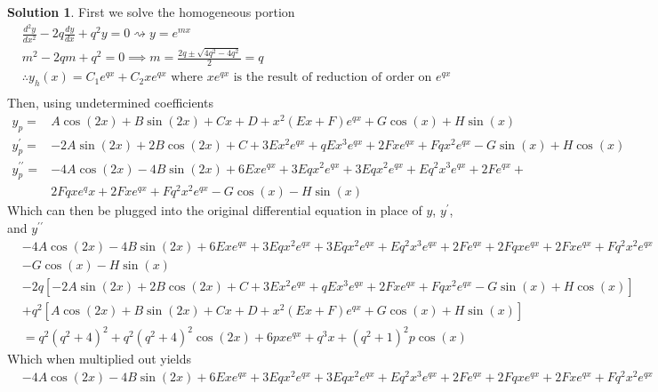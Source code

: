 \documentclass[10pt]{article}
\theoremstyle{definition}
\newtheorem{soln}{Solution}
\begin{document}
\begin{soln} First we solve the homogeneous portion
  \begin{align*}
     & \frac{d^2y}{dx^2}-2q\frac{dy}{dx}+q^2y=0\rightsquigarrow y=e^{mx}                                                    \\
     & m^2-2qm+q^2=0 \implies m = \frac{2q\pm\sqrt{4q^2-4q^2}}{2} = q                                                       \\
     & \therefore y_h(x)=C_1e^{qx}+C_2xe^{qx} \text{ where } xe^{qx} \text{ is the result of reduction of order on } e^{qx} \\
  \end{align*}
  Then, using undetermined coefficients
  \begin{align*}
    y_p=                & A\cos\left(2x\right)+B\sin\left(2x\right)+Cx+D+x^2\left(Ex+F\right)e^{qx}+G\cos(x)+H\sin(x) \\
    y_p^\prime=         & -2A\sin(2x)+2B\cos(2x)+C+3Ex^2e^{qx}+qEx^3e^{qx}+2Fxe^{qx}+Fqx^2e^{qx}-G\sin(x)+H\cos(x)    \\
    y_p^{\prime\prime}= & -4A\cos(2x)-4B\sin(2x)+6Exe^{qx}+3Eqx^2e^{qx}+3Eqx^2e^{qx}+Eq^2x^3e^{qx}+2Fe^{qx}+          \\ 
                        & 2Fqxe^qx+2Fxe^{qx}+Fq^2x^2e^{qx}-G\cos(x)-H\sin(x)
  \end{align*}
  Which can then be plugged into the original differential equation in place of $y$, $y^\prime$, and $y^{\prime\prime}$
  \begin{align*}
     & -4A\cos(2x)-4B\sin(2x)+6Exe^{qx}+3Eqx^2e^{qx}+3Eqx^2e^{qx}+Eq^2x^3e^{qx}+2Fe^{qx}+2Fqxe^{qx}+2Fxe^{qx}+Fq^2x^2e^{qx} \\ &-G\cos(x)-H\sin(x)    \\                                                              
     & -2q\left[-2A\sin(2x)+2B\cos(2x)+C+3Ex^2e^{qx}+qEx^3e^{qx}+2Fxe^{qx}+Fqx^2e^{qx}-G\sin(x)+H\cos(x)\right]             \\
     & +q^2\left[A\cos\left(2x\right)+B\sin\left(2x\right)+Cx+D+x^2\left(Ex+F\right)e^{qx}+G\cos(x)+H\sin(x)\right]         \\ 
     & =q^2\left(q^2+4\right)^2+q^2\left(q^2+4\right)^2\cos\left(2x\right)+6pxe^{qx}+q^3x+(q^2+1)^2p\cos\left(x\right)
  \end{align*}
  Which when multiplied out yields 
  \begin{align*}
     & -4A\cos(2x)-4B\sin(2x)+6Exe^{qx}+3Eqx^2e^{qx}+3Eqx^2e^{qx}+Eq^2x^3e^{qx}+2Fe^{qx}+2Fqxe^{qx}+2Fxe^{qx}+Fq^2x^2e^{qx}               \\ 

\end{align*}
\end{soln}
\end{document}
